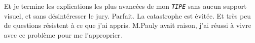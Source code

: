 \documentclass[12pt,final]{report} %
\newcommand{\majuscule}[1]{\emph{\texttt{#1}}}
\begin{document}
{Et je termine les explications les plus avancées de mon \majuscule{TIPE} sans aucun support visuel, et sans désintéresser le jury. Parfait. La catastrophe est évitée. Et très peu de questions résistent à ce que j'ai appris. M.Pauly avait raison, j'ai réussi à vivre avec ce problème pour me l'approprier.

\newpage

\newpage



%



}
\end{document}
